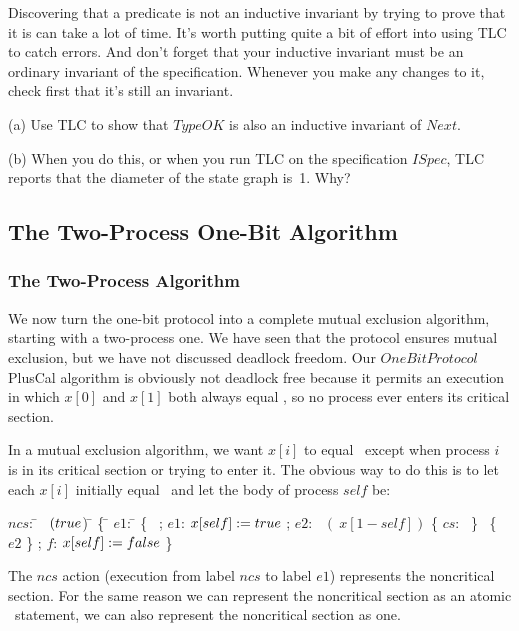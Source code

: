 \documentclass[fleqn,leqno]{article}
\begin{document}
Discovering that a predicate is not an inductive invariant by trying
to prove that it is can take a lot of time.  It's worth putting quite a
bit of effort into using TLC to catch errors.  And don't forget that
your inductive invariant must be an ordinary invariant of the
specification.  Whenever you make any changes to it, check first that
it's still an invariant.

\begin{question}
(a) Use TLC to show that $TypeOK$ is also an inductive invariant of $Next$.

(b) When you do this, or when you run TLC on the specification
$ISpec$, TLC reports that the diameter of the state graph is~1.  Why?
\end{question}

\subsection{The Two-Process One-Bit Algorithm}



\subsubsection{The Two-Process Algorithm}

We now turn the one-bit protocol into a complete mutual exclusion
algorithm, starting with a two-process one.  We have seen that the
protocol ensures mutual exclusion, but we have not discussed deadlock
freedom.  Our $OneBitProtocol$ PlusCal algorithm is obviously not
deadlock free because it permits an execution in which $x[0]$ and
$x[1]$ both always equal \TRUE, so no process ever enters its critical
section.  

In a mutual exclusion algorithm, we want $x[i]$ to equal \FALSE\
except when process $i$ is in its critical section or trying to enter
it.  The obvious way to do this is to let each $x[i]$ initially equal
\FALSE\ and let the body of process $self$ be:
\begin{display}
\begin{tabbing}
$ncs$: \=\+ \pwhile\ $(\TRUE$) 
        \=\+ \{ \= $e1$:  \= \kill
         \{ \> \> \pskip\ ; 
            \> $e1$:  \> $x[self] := \TRUE$ ; \V{.2}
            \> $e2$:  \> \pif\ $(~x[1-self])$ \{ $cs$: \pskip\ \}  
            \>        \> \pelse\ \{ \goto\ $e2$ \} ;   
            \> $f$:   \> $x[self] := \FALSE$   \V{.2}
             \}
\end{tabbing}
\end{display}
The $ncs$ action (execution from label $ncs$ to label $e1$) represents
the noncritical section.  For the same reason we can
represent the noncritical section as an atomic \pskip\ statement, we
can also represent the noncritical section as one.
\end{document}
